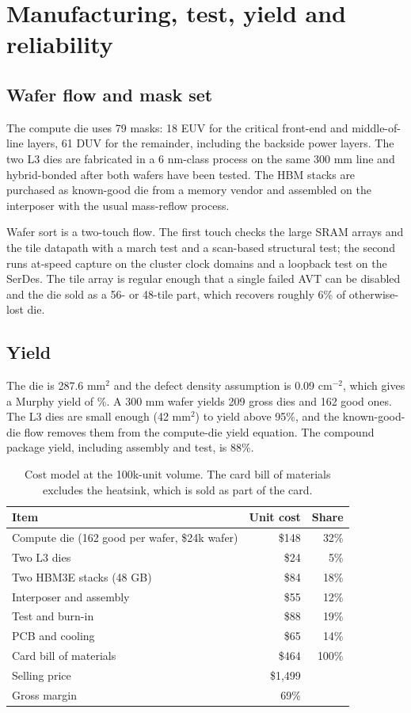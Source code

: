 \FloatBarrier
\section{Manufacturing, test, yield and reliability}\label{sec:mfg}

\subsection{Wafer flow and mask set}
The compute die uses 79 masks: 18 EUV for the critical front-end and middle-of-line layers, 61 DUV
for the remainder, including the backside power layers. The two L3 dies are fabricated in a
6 nm-class process on the same 300 mm line and hybrid-bonded after both wafers have been tested.
The HBM stacks are purchased as known-good die from a memory vendor and assembled on the
interposer with the usual mass-reflow process.

Wafer sort is a two-touch flow. The first touch checks the large SRAM arrays and the tile
datapath with a march test and a scan-based structural test; the second runs at-speed capture on
the cluster clock domains and a loopback test on the SerDes. The tile array is regular enough that
a single failed AVT can be disabled and the die sold as a 56- or 48-tile part, which recovers
roughly 6\% of otherwise-lost die.

\subsection{Yield}
The die is 287.6 mm$^2$ and the defect density assumption is 0.09 cm$^{-2}$, which gives a Murphy
yield of \ACYieldDie\%. A 300 mm wafer yields 209 gross dies and 162 good ones. The L3 dies are
small enough (42 mm$^2$) to yield above 95\%, and the known-good-die flow removes them from the
compute-die yield equation. The compound package yield, including assembly and test, is 88\%.

\begin{table}[t]
\centering\small
\caption{Cost model at the 100k-unit volume. The card bill of materials excludes the heatsink,
which is sold as part of the card.}
\label{tab:cost}
\begin{tabular}{@{}lrr@{}}
\toprule
Item & Unit cost & Share\\
\midrule
Compute die (162 good per wafer, \$24k wafer) & \$148 & 32\%\\
Two L3 dies & \$24 & 5\%\\
Two HBM3E stacks (48 GB) & \$84 & 18\%\\
Interposer and assembly & \$55 & 12\%\\
Test and burn-in & \$88 & 19\%\\
PCB and cooling & \$65 & 14\%\\
\midrule
Card bill of materials & \$464 & 100\%\\
Selling price & \$1{,}499 & \\
Gross margin & 69\% & \\
\bottomrule
\end{tabular}
\end{table}

